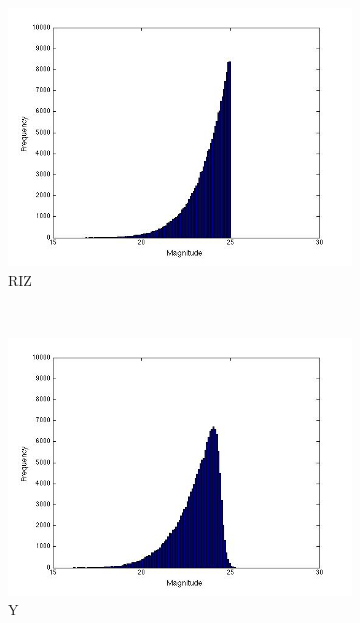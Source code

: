\documentclass[useAMS,usenatbib,fleqn]{mn2e}
\begin{document}
\begin{figure}
        \begin{subfigure}[b]{0.2\textwidth}
                \includegraphics[trim = 35px 15px 50px 25px, clip=true,width=\textwidth]{figures/RIZ.jpg}
                \caption{RIZ}
        \end{subfigure}
        ~
        \begin{subfigure}[b]{0.2\textwidth}
                \includegraphics[trim = 35px 15px 50px 25px, clip=true,width=\textwidth]{figures/Y.jpg}
                \caption{Y}
        \end{subfigure}
         ~
        \begin{subfigure}[b]{0.2\textwidth}

\end{subfigure}
\end{figure}
\end{document}
